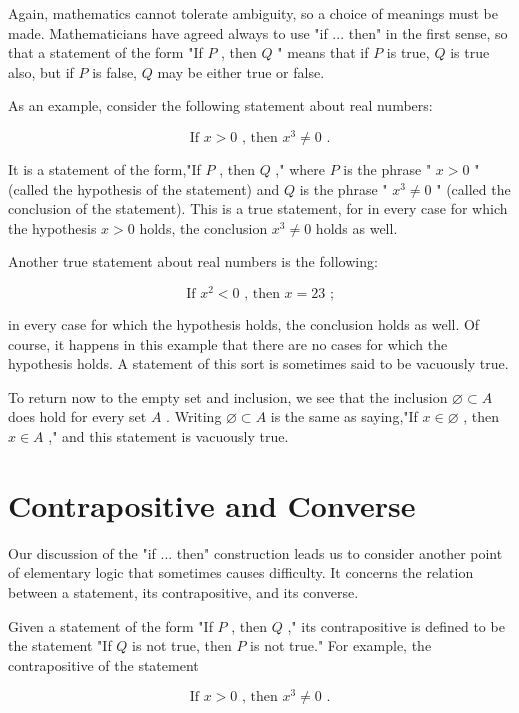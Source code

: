 \documentclass[10pt]{article}
\begin{document}
Again, mathematics cannot tolerate ambiguity, so a choice of meanings must be made. Mathematicians have agreed always to use "if ... then" in the first sense, so that a statement of the form "If \(P\) , then \(Q\) " means that if \(P\) is true, \(Q\) is true also, but if \(P\) is false, \(Q\) may be either true or false.

As an example, consider the following statement about real numbers:

\[
\text{ If }x > 0\text{ , then }{x}^{3} \neq  0\text{ . }
\]

It is a statement of the form,"If \(P\) , then \(Q\) ," where \(P\) is the phrase " \(x > 0\) " (called the hypothesis of the statement) and \(Q\) is the phrase " \({x}^{3} \neq  0\) " (called the conclusion of the statement). This is a true statement, for in every case for which the hypothesis \(x > 0\) holds, the conclusion \({x}^{3} \neq  0\) holds as well.

Another true statement about real numbers is the following:

\[
\text{ If }{x}^{2} < 0\text{ , then }x = {23}\text{ ; }
\]

in every case for which the hypothesis holds, the conclusion holds as well. Of course, it happens in this example that there are no cases for which the hypothesis holds. A statement of this sort is sometimes said to be vacuously true.

To return now to the empty set and inclusion, we see that the inclusion \(\varnothing  \subset  A\) does hold for every set \(A\) . Writing \(\varnothing  \subset  A\) is the same as saying,"If \(x \in  \varnothing\) , then \(x \in  A\) ," and this statement is vacuously true.

\section*{Contrapositive and Converse}

Our discussion of the "if ... then" construction leads us to consider another point of elementary logic that sometimes causes difficulty. It concerns the relation between a statement, its contrapositive, and its converse.

Given a statement of the form "If \(P\) , then \(Q\) ," its contrapositive is defined to be the statement "If \(Q\) is not true, then \(P\) is not true." For example, the contrapositive of the statement

\[
\text{ If }x > 0\text{ , then }{x}^{3} \neq  0\text{ . }
\]
\end{document}
